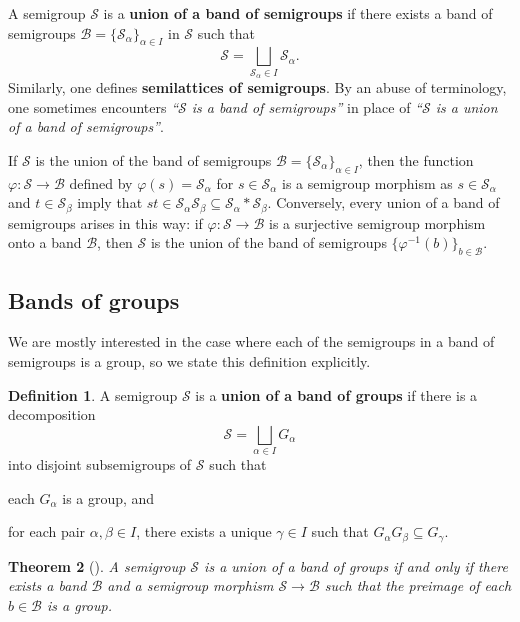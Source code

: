 \documentclass[11pt, oneside, reqno]{amsart}
\newtheorem{theorem}{Theorem}[section]
\theoremstyle{definition}
\newtheorem{definition}[theorem]{Definition}
\numberwithin{equation}{section}
\newcommand{\defn}[1]{{\color{RoyalBlue}\bf#1}}
\def \BB{{\mathcal{B}}}
\def \SS{{\mathcal{S}}}
\begin{document}
A semigroup $\SS$ is a \defn{union of a band of semigroups} if there exists
a band of semigroups $\BB = \{\SS_\alpha\}_{\alpha \in I}$ in $\SS$ such that
\begin{equation*}
    \SS = \bigsqcup_{\SS_\alpha \in I} \SS_\alpha.
\end{equation*}
Similarly, one defines \defn{semilattices of semigroups}.
By an abuse of terminology, one sometimes encounters \emph{``$\SS$ is a band of
semigroups''} in place of \emph{``$\SS$ is a union of a band of semigroups''}.

If $\SS$ is the union of the band of semigroups $\BB
= \{\SS_\alpha\}_{\alpha \in I}$, then the function
$\varphi: \SS \xrightarrow{} \BB$ defined by
$\varphi(s) = \SS_\alpha$ for $s \in \SS_\alpha$ is a semigroup
morphism as $s \in \SS_\alpha$ and $t \in \SS_\beta$ imply that
$s t \in \SS_\alpha \SS_\beta \subseteq \SS_\alpha \ast \SS_\beta$.
Conversely, every union of a band of semigroups arises in this way: if
$\varphi: \SS \xrightarrow{} \BB$ is a surjective semigroup morphism
onto a band $\BB$, then $\SS$ is the union of the band of semigroups
$\{\varphi^{-1}(b)\}_{b \in \BB}$.

\subsection{Bands of groups}
\label{bands-of-groups}

We are mostly interested in the case where each of the semigroups in a band of
semigroups is a group, so we state this definition explicitly.

\begin{definition}
    A semigroup $\SS$ is a \defn{union of a band of groups} if there is a decomposition
    \begin{equation*}
        \SS = \bigsqcup_{\alpha \in I} G_\alpha
    \end{equation*}
    into disjoint subsemigroups of $\SS$ such that
    \begin{enumerate*}[label=(\roman*)]
        \item each $G_\alpha$ is a group, and
        \item for each pair $\alpha, \beta \in I$, there exists
              a unique $\gamma \in I$ such that $G_\alpha G_\beta \subseteq G_\gamma$.
    \end{enumerate*}
\end{definition}

\begin{theorem}[{\cite[Theorem 1]{clifford}}]
    \label{theorem-clifford-band-of-groups}
    A semigroup $\SS$ is a union of a band of groups if and only if there exists a band $\BB$ and a
    semigroup morphism $\SS \to \BB$ such that the preimage of each $b \in \BB$ is a group.
\end{theorem}
\end{document}
